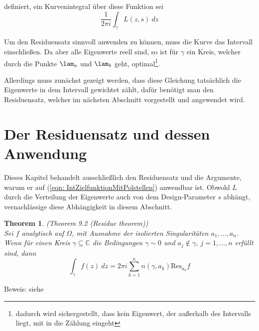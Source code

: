 \documentclass[a4paper,12pt]{report}
\newcommand{\C}{\mathbb C}
\newcommand{\1}{\mathds{1}}
\newcommand{\Res}{\text{Res}}
\theoremstyle{plain} %
\newtheorem{theorem}{Theorem}
\theoremstyle{definition} %
\theoremstyle{remark}
\begin{document}
            definiert, ein Kurvenintegral über diese Funktion sei
            \begin{equation}
                  \label{eqn: IntZielfunktionMitPolstellen}
                  \frac{1}{2\pi i}\int_\gamma L(z, s)\ dz
            \end{equation}

            Um den Residuensatz sinnvoll anwenden zu können, muss die Kurve \gamm das Intervall \lamAlamB einschließen.
            Da aber alle Eigenwerte reell sind, so ist für $\gamma$ ein Kreis, welcher durch die Punkte $\lam_a$ und $\lam_b$ geht, optimal\footnote{dadurch wird sichergestellt, dass kein Eigenwert, der außerhalb des Intervalls \lamAlamB liegt, mit in die Zählung eingeht}.

            Allerdings muss zunächst gezeigt werden, dass diese Gleichung tatsächlich die Eigenwerte in dem Intervall gewichtet zählt, dafür benötigt man den Residuensatz, welcher im nächsten Abschnitt vorgestellt und angewendet wird.

      \section{Der Residuensatz und dessen Anwendung}
            Dieses Kapitel behandelt ausschließlich den Residuensatz und die Argumente, warum er auf (\ref{eqn: IntZielfunktionMitPolstellen}) anwendbar ist.
            Obwohl $L$ durch die Verteilung der Eigenwerte auch von dem Design-Parameter $s$ abhängt, vernachlässige diese Abhängigkeit in diesem Abschnitt.

            \begin{theorem}(Theorem 9.2 (Residue theorem)\cite[S. 141]{complexAnalysis})\\
                  \label{thrm: Residuensatz}
                  Sei $f$ analytisch auf $\Omega$, mit Ausnahme der isolierten Singularitäten $a_1,\dots,a_n$. Wenn für einen Kreis $\gamma\subseteq\C$ die Bedingungen $\gamma \sim 0$ und $a_j\notin \gamma,\ j=1,\dots,n$ erfüllt sind, dann
                  $$\int_\gamma f(z)\ dz = 2\pi i\sum_{k=1}^{n} n(\gamma, a_k)\Res_{a_k}f$$
            \end{theorem}
            Beweis: siehe \cite[S. 142]{complexAnalysis}
\end{document}
